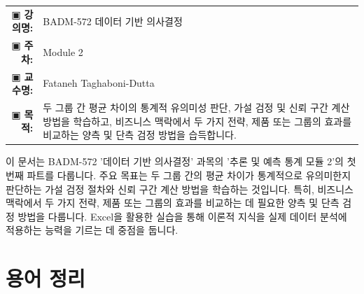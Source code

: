 \documentclass[11pt,a4paper]{article}
\makeatletter
\theoremstyle{definition}
\newcommand{\metainfo}[4]{
\begin{tcolorbox}[
    colback=lightpurple,
    colframe=darkpurple,
    boxrule=1pt,
    arc=2mm,
    left=10pt,
    right=10pt,
    top=8pt,
    bottom=8pt
]
\begin{tabular}{@{}rl@{}}
▣ \textbf{강의명:} & #1 \\[0.3em]
▣ \textbf{주차:} & #2 \\[0.3em]
▣ \textbf{교수명:} & #3 \\[0.3em]
▣ \textbf{목적:} & \begin{minipage}[t]{0.75\textwidth}#4\end{minipage}
\end{tabular}
\end{tcolorbox}
}
\makeatother
\begin{document}
\thispagestyle{firstpage}

\metainfo{BADM-572 데이터 기반 의사결정}{Module 2}{Fataneh Taghaboni-Dutta}{두 그룹 간 평균 차이의 통계적 유의미성 판단, 가설 검정 및 신뢰 구간 계산 방법을 학습하고, 비즈니스 맥락에서 두 가지 전략, 제품 또는 그룹의 효과를 비교하는 양측 및 단측 검정 방법을 습득합니다.}

\tableofcontents

\newpage

\begin{summarybox}[title=모듈 2: 추론 및 예측 통계 개요]
이 문서는 BADM-572 '데이터 기반 의사결정' 과목의 '추론 및 예측 통계 모듈 2'의 첫 번째 파트를 다룹니다.
주요 목표는 두 그룹 간의 평균 차이가 통계적으로 유의미한지 판단하는 가설 검정 절차와 신뢰 구간 계산 방법을 학습하는 것입니다.
특히, 비즈니스 맥락에서 두 가지 전략, 제품 또는 그룹의 효과를 비교하는 데 필요한 양측 및 단측 검정 방법을 다룹니다.
Excel을 활용한 실습을 통해 이론적 지식을 실제 데이터 분석에 적용하는 능력을 기르는 데 중점을 둡니다.
\end{summarybox}

\newpage
\section{용어 정리}
\end{document}
